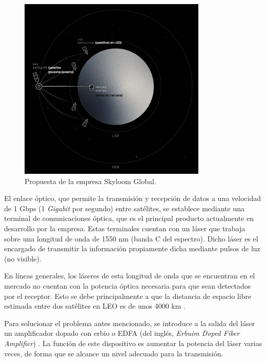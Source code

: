 \begin{figure}[H]
\centering
\includegraphics[width=0.8\textwidth]{./Figures/propuesta_skyloom.png}
\caption{Propuesta de la empresa Skyloom Global\protect\footnotemark.}
\label{fig:propSky}
\end{figure}


El enlace óptico, que permite la transmisión y recepción de datos a una velocidad de 1 Gbps (1 \textit{Gigabit} por segundo) entre satélites, se establece mediante una terminal de comunicaciones óptica, que es el principal producto actualmente en desarrollo por la empresa. Estas terminales cuentan con un láser que trabaja sobre una longitud de onda de 1550 nm (banda C del espectro). Dicho láser es el encargado de transmitir la información propiamente dicha mediante pulsos de luz (no visible).

En líneas generales, los láseres de esta longitud de onda que se encuentran en el mercado no cuentan con la potencia óptica necesaria para que sean detectados por el receptor. Esto se debe principalmente a que la distancia de espacio libre estimada entre dos satélites en LEO es de unos 4000 km \citep{WEBSITE_SKY}.

Para solucionar el problema antes mencionado, se introduce a la salida del láser un amplificador dopado con erbio o EDFA (del inglés, \textit{Erbuim Doped Fiber Amplifier}) \citep{WEBSITE:EDFA2}. La función de este dispositivo es aumentar la potencia del láser varias veces, de forma que se alcance un nivel adecuado para la transmisión.

